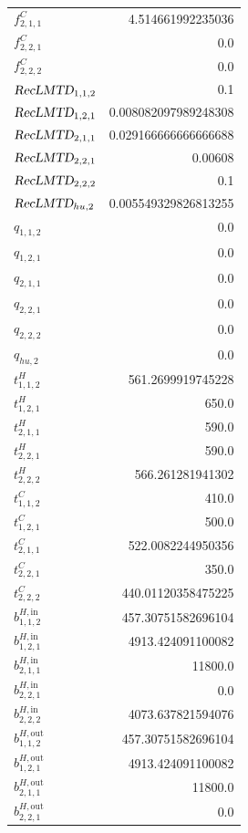 \documentclass{article}%
\begin{document}
\begin{multicols*}{3}
\begin{supertabular}{lr}
	$f_{2,1,1}^{C}$ & 4.514661992235036 \\%
	$f_{2,2,1}^{C}$ & 0.0 \\%
	$f_{2,2,2}^{C}$ & 0.0 \\%
	$\textsl{RecLMTD}_{1,1,2}$ & 0.1 \\%
	$\textsl{RecLMTD}_{1,2,1}$ & 0.008082097989248308 \\%
	$\textsl{RecLMTD}_{2,1,1}$ & 0.029166666666666688 \\%
	$\textsl{RecLMTD}_{2,2,1}$ & 0.00608 \\%
	$\textsl{RecLMTD}_{2,2,2}$ & 0.1 \\%
	$\textsl{RecLMTD}_{hu,2}$ & 0.005549329826813255 \\%
	$q_{1,1,2}$ & 0.0 \\%
	$q_{1,2,1}$ & 0.0 \\%
	$q_{2,1,1}$ & 0.0 \\%
	$q_{2,2,1}$ & 0.0 \\%
	$q_{2,2,2}$ & 0.0 \\%
	$q_{hu,2}$ & 0.0 \\%
	$t_{1,1,2}^{H}$ & 561.2699919745228 \\%
	$t_{1,2,1}^{H}$ & 650.0 \\%
	$t_{2,1,1}^{H}$ & 590.0 \\%
	$t_{2,2,1}^{H}$ & 590.0 \\%
	$t_{2,2,2}^{H}$ & 566.261281941302 \\%
	$t_{1,1,2}^{C}$ & 410.0 \\%
	$t_{1,2,1}^{C}$ & 500.0 \\%
	$t_{2,1,1}^{C}$ & 522.0082244950356 \\%
	$t_{2,2,1}^{C}$ & 350.0 \\%
	$t_{2,2,2}^{C}$ & 440.01120358475225 \\%
	$b_{1,1,2}^{H,\text{in}}$ & 457.30751582696104 \\%
	$b_{1,2,1}^{H,\text{in}}$ & 4913.424091100082 \\%
	$b_{2,1,1}^{H,\text{in}}$ & 11800.0 \\%
	$b_{2,2,1}^{H,\text{in}}$ & 0.0 \\%
	$b_{2,2,2}^{H,\text{in}}$ & 4073.637821594076 \\%
	$b_{1,1,2}^{H,\text{out}}$ & 457.30751582696104 \\%
	$b_{1,2,1}^{H,\text{out}}$ & 4913.424091100082 \\%
	$b_{2,1,1}^{H,\text{out}}$ & 11800.0 \\%
	$b_{2,2,1}^{H,\text{out}}$ & 0.0 \\%

\end{supertabular}
\end{multicols*}
\end{document}
